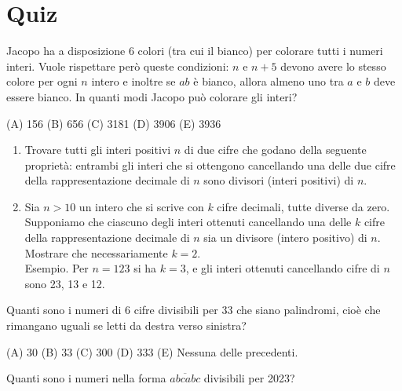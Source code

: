 \chapter{Quiz}
\label{ch:quiz}

\begin{esercizio}
    \label{ex:distrettuali_2019}
    Jacopo ha a disposizione 6 colori (tra cui il bianco) per colorare tutti i numeri interi.
    Vuole rispettare però queste condizioni: $n$ e $n + 5$ devono avere lo stesso colore per ogni $n$ intero e
    inoltre se $ab$ è bianco, allora almeno uno tra $a$ e $b$ deve essere bianco.
    In quanti modi Jacopo può colorare gli interi?

    (A) 156 \quad (B) 656 \quad (C) 3181 \quad (D) 3906 \quad (E) 3936
\end{esercizio}

\begin{esercizio}
    \label{ex:distrettuali_2018}
    \begin{enumerate}
        \item Trovare tutti gli interi positivi $n$ di due cifre che godano della seguente proprietà: entrambi
        gli interi che si ottengono cancellando una delle due cifre della rappresentazione decimale
        di $n$ sono divisori (interi positivi) di $n$.
        \item Sia $n > 10$ un intero che si scrive con $k$ cifre decimali, tutte diverse da zero.
        Supponiamo che ciascuno degli interi ottenuti cancellando una delle $k$ cifre della rappresentazione decimale
        di $n$ sia un divisore (intero positivo) di $n$.
        Mostrare che necessariamente $k = 2$. \\
        Esempio.
        Per $n = 123$ si ha $k = 3$, e gli interi ottenuti cancellando cifre di $n$ sono 23, 13 e 12.
    \end{enumerate}
\end{esercizio}

\begin{esercizio}
    \label{ex:distrettuali_2021}
    Quanti sono i numeri di 6 cifre divisibili per 33 che siano palindromi, cioè che rimangano uguali
    se letti da destra verso sinistra?

    (A) 30 \quad (B) 33 \quad (C) 300 \quad (D) 333 \quad (E) Nessuna delle precedenti.
\end{esercizio}

\begin{esercizio}
    \label{ex:francesco_1}
    Quanti sono i numeri nella forma $\overline{abcabc}$ divisibili per 2023?
\end{esercizio}